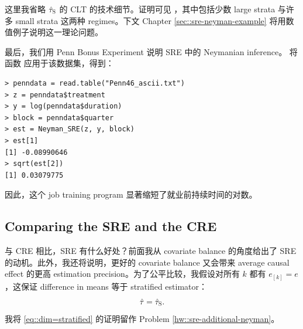 这里我省略 $\hat{\tau}_\textsc{S} $ 的 CLT 的技术细节。证明可见 \citet{liu2020regression}，其中包括少数 large strata 与许多 small strata 这两种 regimes。下文 Chapter \ref{sec::sre-neyman-example} 将用数值例子说明这一理论问题。






最后，我们用 Penn Bonus Experiment 说明 SRE 中的 Neymanian inference。\label{sec::sre-neyman-example}
将函数  应用于该数据集，得到：
\begin{lstlisting}
> penndata = read.table("Penn46_ascii.txt")
> z = penndata$treatment
> y = log(penndata$duration)
> block = penndata$quarter
> est = Neyman_SRE(z, y, block)
> est[1]
[1] -0.08990646
> sqrt(est[2])
[1] 0.03079775
\end{lstlisting} 
因此，这个 job training program 显著缩短了就业前持续时间的对数。


\subsection{Comparing the SRE and the CRE}

与 CRE 相比，SRE 有什么好处？前面我从 covariate balance 的角度给出了 SRE 的动机。此外，我还将说明，更好的 covariate balance 又会带来 average causal effect 的更高 estimation precision。为了公平比较，我假设对所有 $k$ 都有 $e_{[k]} = e$，这保证 difference in means 等于 stratified estimator：
\begin{equation}
\label{eq::dim=stratified}
\hat{\tau} = \hat{\tau}_\textsc{S}.
\end{equation}
我将 \eqref{eq::dim=stratified} 的证明留作 Problem \ref{hw::sre-additional-neyman}。





